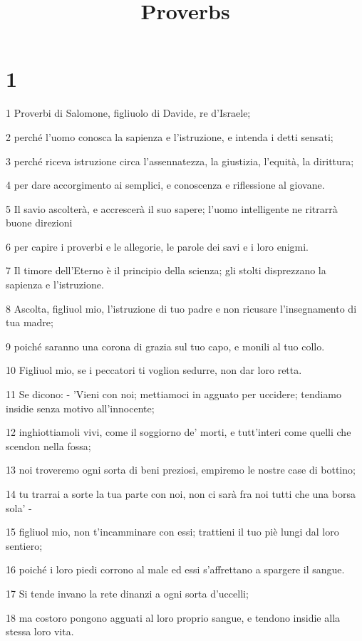 

\title{Proverbs}


\chapter{1}

\par 1 Proverbi di Salomone, figliuolo di Davide, re d'Israele;
\par 2 perché l'uomo conosca la sapienza e l'istruzione, e intenda i detti sensati;
\par 3 perché riceva istruzione circa l'assennatezza, la giustizia, l'equità, la dirittura;
\par 4 per dare accorgimento ai semplici, e conoscenza e riflessione al giovane.
\par 5 Il savio ascolterà, e accrescerà il suo sapere; l'uomo intelligente ne ritrarrà buone direzioni
\par 6 per capire i proverbi e le allegorie, le parole dei savi e i loro enigmi.
\par 7 Il timore dell'Eterno è il principio della scienza; gli stolti disprezzano la sapienza e l'istruzione.
\par 8 Ascolta, figliuol mio, l'istruzione di tuo padre e non ricusare l'insegnamento di tua madre;
\par 9 poiché saranno una corona di grazia sul tuo capo, e monili al tuo collo.
\par 10 Figliuol mio, se i peccatori ti voglion sedurre, non dar loro retta.
\par 11 Se dicono: - 'Vieni con noi; mettiamoci in agguato per uccidere; tendiamo insidie senza motivo all'innocente;
\par 12 inghiottiamoli vivi, come il soggiorno de' morti, e tutt'interi come quelli che scendon nella fossa;
\par 13 noi troveremo ogni sorta di beni preziosi, empiremo le nostre case di bottino;
\par 14 tu trarrai a sorte la tua parte con noi, non ci sarà fra noi tutti che una borsa sola' -
\par 15 figliuol mio, non t'incamminare con essi; trattieni il tuo piè lungi dal loro sentiero;
\par 16 poiché i loro piedi corrono al male ed essi s'affrettano a spargere il sangue.
\par 17 Si tende invano la rete dinanzi a ogni sorta d'uccelli;
\par 18 ma costoro pongono agguati al loro proprio sangue, e tendono insidie alla stessa loro vita.
